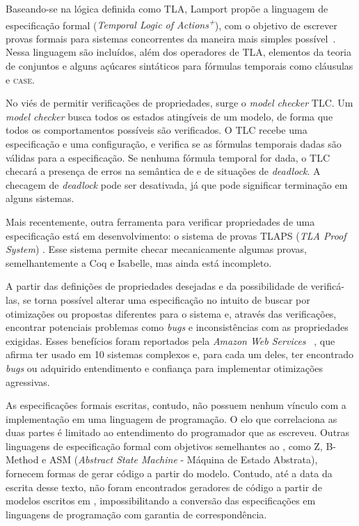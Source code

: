 Baseando-se na lógica definida como TLA, Lamport propõe a linguagem de especificação formal \TLA (\textit{Temporal Logic of Actions\textsuperscript{+}}), com o objetivo de escrever provas formais para sistemas concorrentes da maneira mais simples possível~\cite{tlahistory}. Nessa linguagem são incluídos, além dos operadores de TLA, elementos da teoria de conjuntos e alguns açúcares sintáticos para fórmulas temporais como cláusulas \IF e \textsc{case}.

No viés de permitir verificações de propriedades, surge o \textit{model checker} TLC. Um \textit{model checker} busca todos os estados atingíveis de um modelo, de forma que todos os comportamentos possíveis são verificados. O TLC recebe uma especificação e uma configuração, e verifica se as fórmulas temporais dadas são válidas para a especificação. Se nenhuma fórmula temporal for dada, o TLC checará a presença de erros na semântica de \TLA e de situações de \textit{deadlock}. A checagem de \textit{deadlock} pode ser desativada, já que pode significar terminação em alguns sistemas.

Mais recentemente, outra ferramenta para verificar propriedades de uma especificação está em desenvolvimento: o sistema de provas TLAPS (\textit{TLA Proof System}) \cite{tlaps2010}. Esse sistema permite checar mecanicamente algumas provas, semelhantemente a Coq e Isabelle, mas ainda está incompleto.

A partir das definições de propriedades desejadas e da possibilidade de verificá-las, se torna possível alterar uma especificação no intuito de buscar por otimizações ou propostas diferentes para o sistema e, através das verificações, encontrar potenciais pro\-ble\-mas como \textit{bugs} e inconsistências com as propriedades exigidas. Esses benefícios foram reportados pela \textit{Amazon Web Services} ~\cite{amazon}, que afirma ter usado \TLA em 10 sistemas complexos e, para cada um deles, ter encontrado \textit{bugs} ou adquirido entendimento e confiança para implementar otimizações agressivas.

As especificações formais escritas, contudo, não possuem nenhum vínculo com a implementação em uma linguagem de programação. O elo que correlaciona as duas partes é limitado ao entendimento do programador que as escreveu. Outras linguagens de especificação formal com objetivos semelhantes ao \TLAA, como Z, B-Method e ASM (\textit{Abstract State Machine} - Máquina de Estado Abstrata), fornecem formas de gerar código a partir do modelo. Contudo, até a data da escrita desse texto, não foram encontrados geradores de código a partir de modelos escritos em \TLAA, impossibilitando a conversão das especificações em linguagens de programação com garantia de correspondência.

